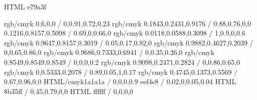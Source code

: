 


\graphicspath{ {./graphics/pictures/} } %




\geometry{a4paper,tmargin=20mm,rmargin=25mm,lmargin=25mm,margin=21mm,bmargin=20mm,footskip=5mm}

\selectcolormodel{\targetcolourmodel}

\definecolor{honey}  {HTML}     {e79a3f}

\definecolor{dtured}     {rgb/cmyk} {0.6,0,0 / 0,0.91,0.72,0.23}
\definecolor{blue}       {rgb/cmyk} {0.1843,0.2431,0.9176 / 0.88,0.76,0,0}
\definecolor{brightgreen}{rgb/cmyk} {0.1216,0.8157,0.5098 / 0.69,0,0.66,0}
\definecolor{navyblue}   {rgb/cmyk} {0.0118,0.0588,0.3098 / 1,0.9,0,0.6}
\definecolor{yellow}     {rgb/cmyk} {0.9647,0.8157,0.3019 / 0.05,0.17,0.82,0}
\definecolor{orange}     {rgb/cmyk} {0.9882,0.4627,0.2039 / 0,0.65,0.86,0}
\definecolor{pink}       {rgb/cmyk} {0.9686,0.7333,0.6941 / 0,0.35,0.26,0}
\definecolor{grey}       {rgb/cmyk} {0.8549,0.8549,0.8549 / 0,0,0,0.2}
\definecolor{red}        {rgb/cmyk} {0.9098,0.2471,0.2824 / 0,0.86,0.65,0}
\definecolor{green}      {rgb/cmyk} {0,0.5333,0.2078 / 0.89,0.05,1,0.17}
\definecolor{purple}     {rgb/cmyk} {0.4745,0.1373,0.5569 / 0.67,0.96,0,0}
\definecolor{TECblack}   {HTML/cmyk}{1a1a1a / 0,0,0,0.9}
\definecolor{TECoffwhite}{HTML}     {eef4e8 / 0.02,0,0.05,0.04}
\definecolor{TECviolet}  {HTML}     {8b35ff / 0.45,0.79,0,0}
\definecolor{TECwhite}   {HTML}     {ffffff / 0,0,0,0}

\setmainfont{Arial}

